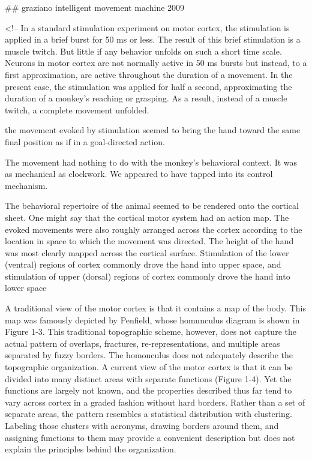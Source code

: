 \documentclass[../main.tex]{subfiles}
\begin{document}
{{## graziano intelligent movement machine 2009

<!-- In a standard stimulation experiment on motor cortex, the stimulation is applied in a brief burst for 50 ms or less. The result of this brief stimulation is a muscle twitch. But little if any behavior unfolds on such a short time scale. Neurons in motor cortex are not normally active in 50 ms bursts but instead, to a first approximation, are active throughout the duration of a movement. In the present case, the stimulation was applied for half a second, approximating the duration of a monkey’s reaching or grasping. As a result, instead of a muscle twitch, a complete movement unfolded.

the movement evoked by stimulation seemed to bring the hand toward the same final position as if in a goal-directed action.

The movement had nothing to do with the monkey’s behavioral context. It was as mechanical as clockwork. We appeared to have tapped into its control mechanism.

The behavioral repertoire of the animal seemed to be rendered onto the cortical sheet. One might say that the cortical motor system had an action map. The evoked movements were also roughly arranged across the cortex according to the location in space to which the movement was directed. The height of the hand was most clearly mapped across the cortical surface. Stimulation of the lower (ventral) regions of cortex commonly drove the hand into upper space, and stimulation of upper (dorsal) regions of cortex commonly drove the hand into lower space

A traditional view of the motor cortex is that it contains a map of the body. This map was famously depicted by Penfield, whose homunculus diagram is shown in Figure 1-3. This traditional topographic scheme, however, does not capture the actual pattern of overlaps, fractures, re-representations, and multiple areas separated by fuzzy borders. The homonculus does not adequately describe the topographic organization. A current view of the motor cortex is that it can be divided into many distinct areas with separate functions (Figure 1-4). Yet the functions are largely not known, and the properties described thus far tend to vary across cortex in a graded fashion without hard borders. Rather than a set of separate areas, the pattern resembles a statistical distribution with clustering. Labeling those clusters with acronyms, drawing borders around them, and assigning functions to them may provide a convenient description but does not explain the principles behind the organization.

}}
\end{document}
